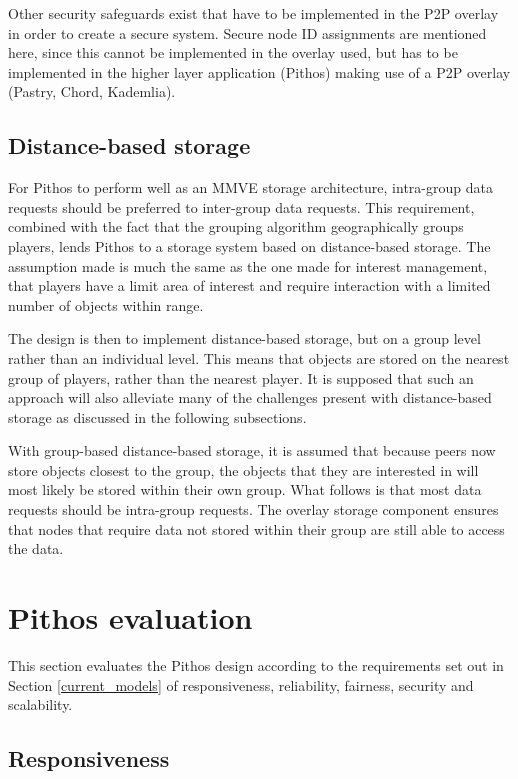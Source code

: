 \documentclass[10pt,a4paper,conference]{IEEEtran}
\begin{document}
Other security safeguards exist that have to be implemented in the P2P overlay in order to create a secure system. Secure node ID assignments are
mentioned here, since this cannot be implemented in the overlay used, but has to be implemented in the higher layer application (Pithos) making use
of a P2P overlay (Pastry, Chord, Kademlia).

\subsection{Distance-based storage} \label{distance_based}

For Pithos to perform well as an MMVE storage architecture, intra-group data requests should be preferred to inter-group data requests. This
requirement, combined with the fact that the grouping algorithm geographically groups players, lends Pithos to a storage system based on
distance-based storage. The assumption made is much the same as the one made for interest management, that players have a limit area of interest and
require interaction with a limited number of objects within range.

The design is then to implement distance-based storage, but on a group level rather than an individual level. This means that objects are stored on
the nearest group of players, rather than the nearest player. It is supposed that such an approach will also alleviate many of the challenges present
with distance-based storage as discussed in the following subsections.

With group-based distance-based storage, it is assumed that because peers now store objects closest to the group, the objects that they are
interested in will most likely be stored within their own group. What follows is that most data requests should be intra-group requests. The overlay
storage component ensures that nodes that require data not stored within their group are still able to access the data.

\section{Pithos evaluation}

This section evaluates the Pithos design according to the requirements set out in Section \ref{current_models} of responsiveness, reliability,
fairness, security and scalability.

\subsection{Responsiveness}
\end{document}
